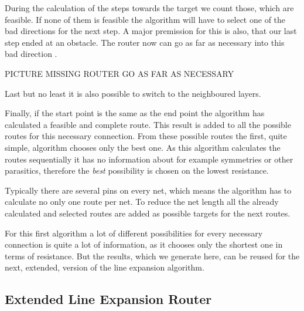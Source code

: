 During the calculation of the steps towards the target we count those, which are feasible. If none of them is feasible the algorithm will have to select one of the bad directions for the next step. A major premission for this is also, that our last step ended at an obstacle. The router now can go as far as necessary into this bad direction .

%	
PICTURE MISSING ROUTER GO AS FAR AS NECESSARY

Last but no least it is also possible to switch to the neighboured layers.

Finally, if the start point is the same as the end point the algorithm has calculated a feasible and complete route. This result is added to all the possible routes for this necessary connection. From these possible routes the first, quite simple, algorithm chooses only the best one. As this algorithm calculates the routes sequentially it has no information about for example symmetries or other parasitics, therefore the \textit{best} possibility is chosen on the lowest resistance.

Typically there are several pins on every net, which means the algorithm has to calculate no only one route per net. To reduce the net length all the already calculated and selected routes are added as possible targets for the next routes.

For this first algorithm a lot of different possibilities for every necessary connection is quite a lot of information, as it chooses only the shortest one in terms of resistance. But the results, which we generate here, can be reused for the next, extended, version of the line expansion algorithm.

\subsection{Extended Line Expansion Router}